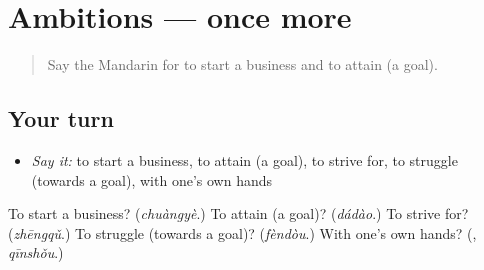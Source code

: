 \section[(dialogue)]{Ambitions — once more}

\label{lesson:ZH-R513-review-final-513}



\begin{quote}
Say the Mandarin for to start a business and to attain (a goal).
\end{quote}

\subsection*{Your turn}
\begin{itemize}
\raggedright
  \item \emph{Say it:} to start a business, to attain (a goal), to strive for, to struggle (towards a goal), with one's own hands
\end{itemize}

\begin{tcolorbox}[breakable,colback=teal!4,colframe=teal!35!black,title={Before you move on}]
To start a business? (\emph{chuàngyè}.) To attain (a goal)? (\emph{dádào}.) To strive for? (\emph{zhēngqǔ}.) To struggle (towards a goal)? (\emph{fèndòu}.) With one's own hands? (\textbf{}, \emph{qīnshǒu}.)
\end{tcolorbox}
